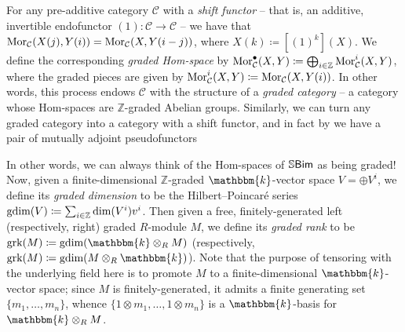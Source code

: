 \noindent For any pre-additive category $\mathcal{C}$ with a {\em shift functor} -- that is, an additive, invertible endofunctor ${(1) : \mathcal{C} \to \mathcal{C}}$ -- we have that $\textup{Mor}_\mathcal{C}(X(j), Y(i)) = \textup{Mor}_\mathcal{C}(X, Y(i-j))$, where $X(k) \coloneqq [(1)^k](X)$. We define the corresponding {\em graded Hom-space} by $\textup{Mor}^\bullet_\mathcal{C}(X, Y) \coloneqq \bigoplus_{i\in\mathbb{Z}} \textup{Mor}_\mathcal{C}^i(X, Y)$, where the graded pieces are given by $\textup{Mor}_\mathcal{C}^i(X, Y) \coloneqq \textup{Mor}_\mathcal{C}(X, Y(i))$. In other words, this process endows $\mathcal{C}$ with the structure of a {\em graded category} -- a category whose Hom-spaces are $\mathbb{Z}$-graded Abelian groups. Similarly, we can turn any graded category into a category with a shift functor, and in fact by \cite[Proposition 11.9]{EMTW20} we have a pair of mutually adjoint pseudofunctors
\begin{center}
\end{center}
\noindent In other words, we can always think of the Hom-spaces of $\mathbb{S}\textup{\textsf{Bim}}$ as being graded!\\

\noindent Now, given a finite-dimensional $\mathbb{Z}$-graded $\mathbbm{k}$-vector space $V = \oplus V^i$, we define its {\em graded dimension} to be the Hilbert--Poincar\'{e} series $\textup{gdim}(V) \coloneqq \sum_{i \in \mathbb{Z}}{\textup{dim}(V^i)v^i}$. Then given a free, finitely-generated left (respectively, right) graded $R$-module $M$, we define its {\em graded rank} to be $\textup{grk}(M) \coloneqq \textup{gdim}(\mathbbm{k} \otimes_R M)$ (respectively, $\textup{grk}(M) \coloneqq \textup{gdim}(M \otimes_R \mathbbm{k})$). Note that the purpose of tensoring with the underlying field here is to promote $M$ to a finite-dimensional $\mathbbm{k}$-vector space; since $M$ is finitely-generated, it admits a finite generating set $\{m_1, \dots, m_n\}$, whence $\{1 \otimes m_1, \dots, 1 \otimes m_n\}$ is a $\mathbbm{k}$-basis for $\mathbbm{k} \otimes_R M$.\\

